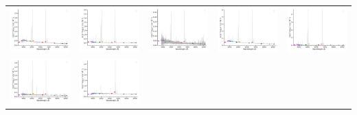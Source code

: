 \begin{center}
\begin{longtable}{l l l l l }
    \includegraphics[width=0.19\linewidth, clip]{Figs/Figs-sdss/spec-0334-51993-0065-SPLUS-n03s28-019988.pdf} & \includegraphics[width=0.19\linewidth, clip]{Figs/Figs-sdss/spec-0334-51993-0365-SPLUS-n02s27-030519.pdf} & \includegraphics[width=0.19\linewidth, clip]{Figs/Figs-sdss/spec-0334-51993-0443-SPLUS-n02s28-028453.pdf} & \includegraphics[width=0.19\linewidth, clip]{Figs/Figs-sdss/spec-0371-52078-0576-STRIPE82-0128-050321.pdf} & \includegraphics[width=0.19\linewidth, clip]{Figs/Figs-sdss/spec-0372-52173-0286-STRIPE82-0127-009047.pdf} \\
    \includegraphics[width=0.19\linewidth, clip]{Figs/Figs-sdss/spec-0372-52173-0296-SPLUS-s02s04-032140.pdf} & \includegraphics[width=0.19\linewidth, clip]{Figs/Figs-sdss/spec-0373-51788-0507-STRIPE82-0132-025641.pdf} \\
  \end{longtable}
\end{center}

